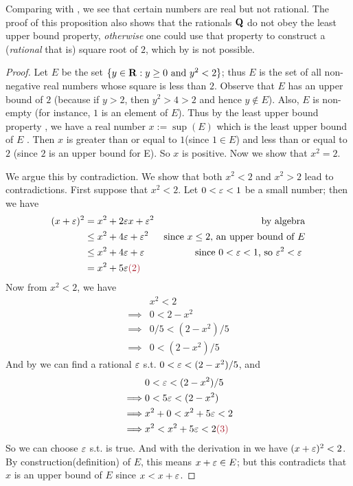 \begin{remark} \label{remark 5.5.13}
Comparing  with , we see that certain numbers are real but not rational.
The proof of this proposition also shows that the rationals \(\mathbf{Q}\) do not obey the least upper bound property, \emph{otherwise} one could use that property to construct a (\emph{rational} that is) square root of \(2\), which by  is not possible.
\end{remark}

\begin{proof}
Let \(E\) be the set \( \{ y \in \mathbf{R} : y \ge 0 \text{ and } y^2 < 2 \} \);
thus \(E\) is the set of all non-negative real numbers whose square is less than \(2\).
Observe that \(E\) has an upper bound of \(2\) (because if \(y > 2\), then \(y^2 > 4 > 2\) and hence \(y \notin E\)).
Also, \(E\) is non-empty (for instance, \(1\) is an element of \(E\)).
Thus by the least upper bound property , we have a real number \(x := \sup(E)\) which is the least upper bound of \(E\) .
Then \(x\) is greater than or equal to \(1\)(since \(1 \in E\)) and less than or equal to \(2\) (since \(2\) is an upper bound for E).
So \(x\) is positive.
Now we show that \(x^2 = 2\).

We argue this by contradiction.
We show that both \(x^2 < 2\) and \(x^2 > 2\) lead to contradictions.
First suppose that \(x^2 < 2\). Let \(0 < \varepsilon < 1\) be a small number;
then we have
\begin{align*}
    (x + \varE)^2 & = x^2 + 2\varE x + \varE^2 & \text{by algebra} \\
                  & \le x^2 + 4\varE + \varE^2 & \text{since \(x \le 2\), an upper bound of \(E\)} \\
                  & \le x^2 + 4\varE + \varE & \text{since \(0 < \varE < 1\), so \(\varE^2 < \varE\) }\\
                  & = x^2 + 5\varE \MAROON{(2)}
\end{align*}
Now from \(x^2 < 2\), we have
\begin{align*}
             & x^2 < 2 \\
    \implies & 0 < 2 - x^2 \\
    \implies & 0/5 < (2 - x^2)/5 \\
    \implies & 0 < (2 - x^2)/5
\end{align*}
And by  we can find a rational \(\varepsilon\) s.t. \(0 < \varepsilon < (2 - x^2)/5\), and
\begin{align*}
             & 0 < \varE < (2 - x^2)/5 \\
    \implies & 0 < 5\varE < (2 - x^2) \\
    \implies & x^2 + 0 < x^2 + 5\varE < 2 \\
    \implies & x^2 < x^2 + 5\varE < 2 \MAROON{(3)}
\end{align*}
So we can choose \(\varepsilon\) s.t.  is true.
And with the derivation in  we have \((x + \varepsilon)^2 < 2\).
By construction(definition) of \(E\), this means \(x + \varepsilon \in E\); but this contradicts  that \(x\) is an upper bound of \(E\) since \(x < x + \varepsilon\).


\end{proof}
